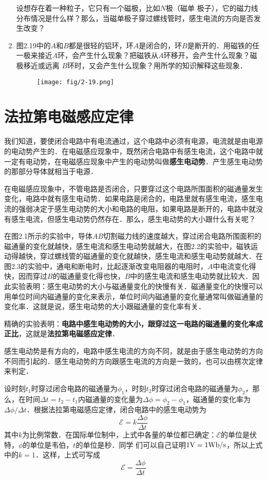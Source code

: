 \begin{enumerate}
  设想存在着一种粒子，它只有一个磁极，比如$N$极（磁单
  极子），它的磁力线分布情况是什么样？那么，当磁单极子穿过螺线管时，感生电流的方向是否发生改变？
  \item 图2.19中的$A$和$B$都是很轻的铝环，环$A$是闭合的，环$B$是断开的．用磁铁的任一极来接近$A$环，会产生什么现象？把磁铁从$A$环移开，会产生什么现象？磁极移近或远离
  $B$环时，又会产生什么现象？用所学的知识解释这些现象．
\begin{figure}[htp]\centering
\texttt{[image: fig/2-19.png]}
\caption{}
\end{figure}
\end{enumerate}

\section{法拉第电磁感应定律}

我们知道，要使闭合电路中有电流通过，这个电路中必须有电源，电流就是由电源的电动势产生的．在电磁感应现象中，既然闭合电路中有感生电流，这个电路中就一定有电动势，在电磁感应现象中产生的电动势叫做\textbf{感生电动势}．产生感生电动势的那部分导体就相当于电源．

在电磁感应现象中，不管电路是否闭合，只要穿过这个电路所围面积的磁通量发生变化，电路中就有感生电动势．如果电路是闭合的，电路里就有感生电流，感生电流的强弱决定于感生电动势的大小和电路的电阻，如果电路是断开的，电路中就没有感生电流，但感生电动势仍然存在．那么，感生电动势的大小跟什么有关呢？

在图2.1所示的实验中，导体$AB$切割磁力线的速度越大，穿过闭合电路所围面积的磁通量的变化就越快，感生电流和感生电动势就越大，在图2.2的实验中，磁铁运动得越快，穿过螺线管的磁通量的变化就越快，感生电流和感生电动势就越大．在图2.3的实验中，通电和断电时，比起逐渐改变电阻器的电阻时，$A$中电流变化得快，因而穿过$B$的磁通量变化得也快，$B$中的感生电流和感生电动势就比较大．因此实验表明：感生电动势的大小与磁通量变化的快慢有关．磁通量变化的快慢可以用单位时间内磁通量的变化来表示，单位时间内磁通量的变化量通常叫做磁通量的变化率．这就是说，感生电动势的大小跟磁通量的变化率有关．

精确的实验表明：\textbf{电路中感生电动势的大小，跟穿过这一电路的磁通量的变化率成正比}，这就是\textbf{法拉第电磁感应定律}．

感生电动势是有方向的，电路中感生电流的方向不同，就是由于感生电动势的方向不同而引起的．感生电动势的方向跟感生电流的方向是一致的，也可以由楞次定律来判定．

设时刻$t_1$时穿过闭合电路的磁通量为$\phi_1$，时刻$t_2$时穿过闭合电路的磁通量为$\phi_2$，那么，在时间$\Delta t=t_2-t_1$内磁通量的变化量为$\Delta \phi=\phi_2-\phi_1$，磁通量的变化率为$\Delta \phi/\Delta t$．根据法拉第电磁感应定律，闭合电路中的感生电动势为
\[\mathcal{E}=k\frac{\Delta \phi}{\Delta t}\]
其中$k$为比例常数．在国际单位制中，上式中各量的单位都已确定：$\mathcal{E}$的单位是伏特，$\phi$的单位是韦伯，$t$的单位是秒．同学
们可以自己证明$1{\rm V}=1{\rm Wb}/{\rm s}$，所以上式中的$k=1$．这样，上式可写成
\begin{equation}
    \mathcal{E}=\frac{\Delta \phi}{\Delta t}
\end{equation}

